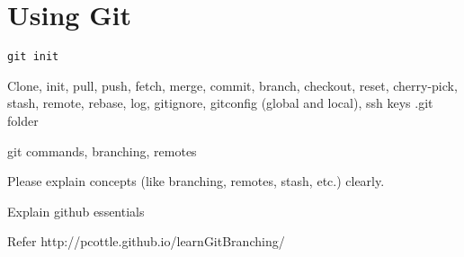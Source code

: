 \documentclass[12pt]{article}
\begin{document}
\section{Using Git}
\texttt{git init}

Clone, init, pull, push, fetch, merge, commit, branch, checkout, reset, cherry-pick, stash, remote, rebase, log, gitignore, gitconfig (global and local), ssh keys
.git folder

git commands, branching, remotes

Please explain concepts (like branching, remotes, stash, etc.) clearly.

Explain github essentials

Refer http://pcottle.github.io/learnGitBranching/
\end{document}
